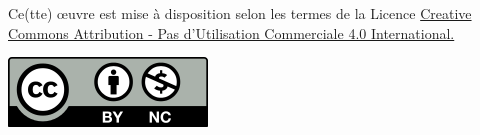 \documentclass[11pt, french]{article}
\makeatletter
\def\maxwidth{\ifdim\Gin@nat@width>\linewidth\linewidth
    \else\Gin@nat@width\fi}
\let\Oldincludegraphics\includegraphics
\renewcommand{\includegraphics}[1]{\Oldincludegraphics[width=.8\maxwidth]{#1}}
\makeatother
\begin{document}
\vspace{3cm} 
 Ce(tte) œuvre est mise à disposition selon les termes de la Licence
\href{https://creativecommons.org/licenses/by-nc/4.0/}{Creative Commons Attribution - Pas d'Utilisation Commerciale 4.0
International.}
\begin{center}
\includegraphics{../img/Cc-by-nc_icon.svg.png}
\end{center}
    
    
    
\end{document}
